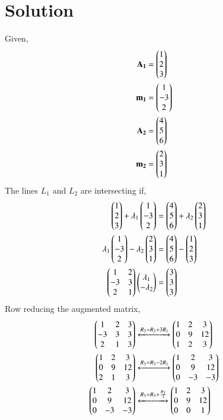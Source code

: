 \documentclass[journal,12pt,twocolumn]{IEEEtran}
\begin{document}
\section{Solution}
Given,
\begin{align}
    \mathbf{A_1} &= \begin{pmatrix}1\\2\\3\end{pmatrix}\\
    \mathbf{m_1} &= \begin{pmatrix}1\\-3\\2\end{pmatrix}\\
    \mathbf{A_2} &= \begin{pmatrix}4\\5\\6\end{pmatrix}\\
    \mathbf{m_2} &= \begin{pmatrix}2\\3\\1\end{pmatrix}
\end{align}
The lines $L_1$ and $L_2$ are intersecting if,
\begin{align}
    \begin{pmatrix}1\\2\\3\end{pmatrix} + \lambda_1 \begin{pmatrix}1\\-3\\2\end{pmatrix} &= \begin{pmatrix}4\\5\\6\end{pmatrix} + \lambda_2 \begin{pmatrix}2\\3\\1\end{pmatrix}\\
    \lambda_1 \begin{pmatrix}1\\-3\\2\end{pmatrix} - \lambda_2 \begin{pmatrix}2\\3\\1\end{pmatrix} &= \begin{pmatrix}4\\5\\6\end{pmatrix} - \begin{pmatrix}1\\2\\3\end{pmatrix}\\
    \begin{pmatrix}1 & 2\\-3 & 3\\2 & 1\end{pmatrix}\begin{pmatrix}\lambda_1 \\ -\lambda_2\end{pmatrix} &= \begin{pmatrix}3\\3\\3\end{pmatrix}
\end{align}
Row reducing the augmented matrix,
\begin{align}
    \begin{pmatrix}1 & 2 & 3\\ -3 & 3 & 3\\ 2 & 1 & 3\end{pmatrix} &\xleftrightarrow{R_2 = R_2 + 3R_1} \begin{pmatrix}1 & 2 & 3\\ 0 & 9 & 12\\1 & 2 & 3\end{pmatrix}\\
    \begin{pmatrix}1 & 2 & 3\\ 0 & 9 & 12\\2 & 1 & 3\end{pmatrix} &\xleftrightarrow{R_3 = R_3 - 2R_1} \begin{pmatrix}1 & 2 & 3\\ 0 & 9 & 12\\0 & -3 & -3\end{pmatrix}\\
    \begin{pmatrix}1 & 2 & 3\\ 0 & 9 & 12\\0 & -3 & -3\end{pmatrix} &\xleftrightarrow{R_3 = R_3 + \frac{R_2}{3}} \begin{pmatrix}1 & 2 & 3\\ 0 & 9 & 12\\0 & 0 & 1\end{pmatrix}
\end{align}
\end{document}
